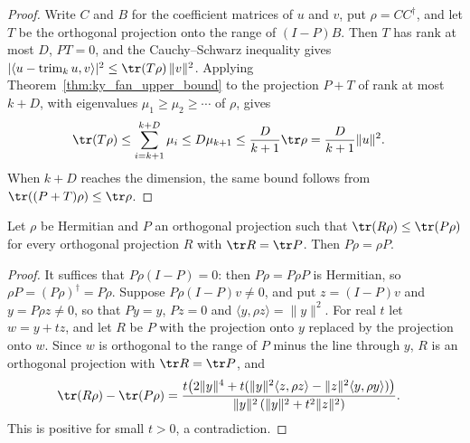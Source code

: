 \begin{proof}
    \leanok
    Write $C$ and $B$ for the coefficient matrices of $u$ and $v$, put
    $\rho=CC^\dagger$, and let $T$ be the orthogonal projection onto the
    range of $(I-P)B$. Then $T$ has rank at most $D$, $PT=0$, and the
    Cauchy--Schwarz inequality gives
    $|\langle u-\operatorname{trim}_k u,v\rangle|^2\le
        \tr(T\rho)\,\|v\|^2$. Applying Theorem~\ref{thm:ky_fan_upper_bound}
    to the projection $P+T$ of rank at most $k+D$, with eigenvalues
    $\mu_1\ge\mu_2\ge\cdots$ of $\rho$, gives
    \begin{align}
        \tr(T\rho) & \le\sum_{i=k+1}^{k+D}\mu_i\le D\mu_{k+1}
        \le\frac{D}{k+1}\tr\rho=\frac{D}{k+1}\|u\|^2.
        \label{eq:trimming_error_ky_fan}
    \end{align}
    When $k+D$ reaches the dimension, the same bound follows from
    $\tr((P+T)\rho)\le\tr\rho$.
\end{proof}

\begin{theorem}
    \label{thm:trace_maximizing_projection_commutes}
    \leanok
    Let $\rho$ be Hermitian and $P$ an orthogonal projection such that
    $\tr(R\rho)\le\tr(P\rho)$ for every orthogonal projection $R$ with
    $\tr R=\tr P$. Then $P\rho=\rho P$.
\end{theorem}

\begin{proof}
    \leanok
    It suffices that $P\rho(I-P)=0$: then $P\rho=P\rho P$ is Hermitian, so
    $\rho P=(P\rho)^\dagger=P\rho$. Suppose $P\rho(I-P)v\ne0$, and put
    $z=(I-P)v$ and $y=P\rho z\ne0$, so that $Py=y$, $Pz=0$ and
    $\langle y,\rho z\rangle=\|y\|^2$. For real $t$ let $w=y+tz$, and let
    $R$ be $P$ with the projection onto $y$ replaced by the projection
    onto $w$. Since $w$ is orthogonal to the range of $P$ minus the line
    through $y$, $R$ is an orthogonal projection with $\tr R=\tr P$, and
    \begin{align}
        \tr(R\rho)-\tr(P\rho) & =
        \frac{t\bigl(2\|y\|^4+t(\|y\|^2\langle z,\rho z\rangle
        -\|z\|^2\langle y,\rho y\rangle)\bigr)}
        {\|y\|^2\,(\|y\|^2+t^2\|z\|^2)}.
        \label{eq:trace_maximizing_projection_rotation}
    \end{align}
    This is positive for small $t>0$, a contradiction.
\end{proof}

